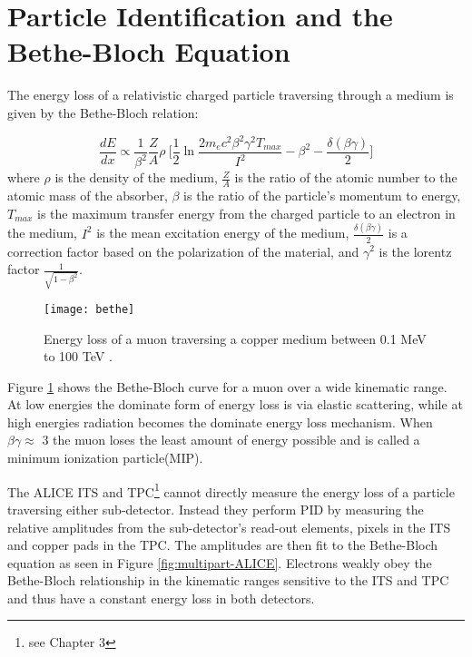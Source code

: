 \section{Particle Identification and the Bethe-Bloch Equation}\label{ref:pid}


The energy loss of a relativistic charged particle traversing through a medium is given by the Bethe-Bloch relation:

\begin{equation}
\frac{dE}{dx} \propto \frac{1}{\beta^{2}} \frac{Z}{A} \rho \  \bigg[ \frac{1}{2} \ln \frac{2 m_{e} c^{2} \beta^{2} \gamma^{2} T_{max}}{I^{2}} - \beta^{2} - \frac{\delta \left( \beta \gamma \right) }{2} \bigg]
\end{equation}
\noindent
where $\rho$ is the density of the medium, $\frac{Z}{A}$ is the ratio of the atomic number to the atomic mass of the absorber, $\beta$ is the ratio of the particle's momentum to energy, $T_{max}$ is the maximum transfer energy from the charged particle to an electron in the medium,  $I^{2}$ is the mean excitation energy of the medium, $\frac{\delta \left( \beta \gamma \right) }{2}$ is a correction factor based on the polarization of the material, and $\gamma^{2}$ is the lorentz factor $\frac{1}{\sqrt{1-\beta^{2}}}$.

\begin{figure}[h]
\texttt{[image: bethe]}
\centering
\caption{ Energy loss of a muon traversing a copper medium between 0.1 MeV to 100 TeV \cite{Patrignani:2016xqp}.}
\label{fig:rawBB}
\end{figure}

Figure \ref{fig:rawBB} shows the Bethe-Bloch curve for a muon over a wide kinematic range.  At low energies the dominate form of energy loss is via elastic scattering, while at high energies radiation becomes the dominate energy loss mechanism. When $\beta \gamma \approx$ 3 the muon loses the least amount of energy possible and is called a minimum ionization particle(MIP).  

The ALICE ITS and TPC\footnote{see Chapter 3} cannot directly measure the energy loss of a particle traversing either sub-detector.  Instead they perform PID by measuring the relative amplitudes from the sub-detector's read-out elements, pixels in the ITS and copper pads in the TPC.  The amplitudes are then fit to the Bethe-Bloch equation as seen in Figure \ref{fig:multipart-ALICE}.  Electrons weakly obey the Bethe-Bloch relationship in the kinematic ranges sensitive to the ITS and TPC and thus have a constant energy loss in both detectors.

